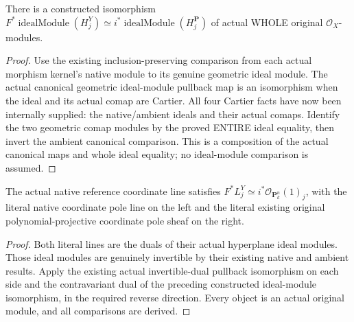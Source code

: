 \begin{definition}
\label{def:seven-original-native-coordinate-ideal-module-iso-route}
\leanok
{}
There is a constructed isomorphism
$F^*\operatorname{idealModule}(H_j^Y)\simeq
 i^*\operatorname{idealModule}(H_j^{\mathbf P})$ of actual WHOLE original
$\mathcal O_X$-modules.
\end{definition}
\begin{proof}
Use the existing inclusion-preserving comparison from each actual morphism
kernel's native module to its genuine geometric ideal module. The actual
canonical geometric ideal-module pullback map is an isomorphism when the
ideal and its actual comap are Cartier. All four Cartier facts have now
been internally supplied: the native/ambient ideals and their actual
comaps. Identify the two geometric comap modules by the proved ENTIRE
ideal equality, then invert the ambient canonical comparison. This is a
composition of the actual canonical maps and whole ideal equality; no
ideal-module comparison is assumed.
\end{proof}

\begin{definition}
\label{def:seven-original-native-coordinate-line-pullback-iso-route}
\leanok
{}
The actual native reference coordinate line satisfies
$F^*L_j^Y\simeq i^*\mathcal O_{\mathbf P^n_k}(1)_j$, with the literal
native coordinate pole line on the left and the literal existing original
polynomial-projective coordinate pole sheaf on the right.
\end{definition}
\begin{proof}
Both literal lines are the duals of their actual hyperplane ideal modules.
Those ideal modules are genuinely invertible by their existing native and
ambient results. Apply the existing actual invertible-dual pullback
isomorphism on each side and the contravariant dual of the preceding
constructed ideal-module isomorphism, in the required reverse direction.
Every object is an actual original module, and all comparisons are derived.
\end{proof}

